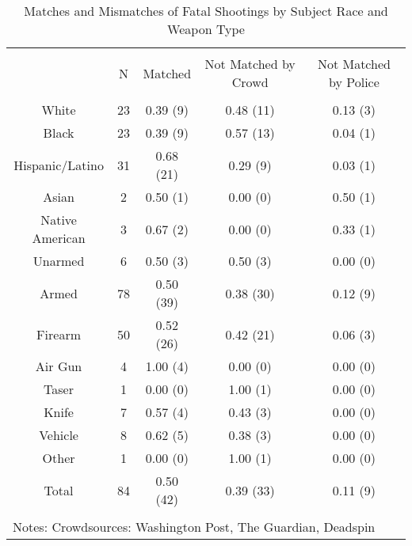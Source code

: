
\begin{table}[!htbp] \centering 
  \caption{Matches and Mismatches of Fatal Shootings by Subject Race and Weapon Type} 
  \label{} 
\footnotesize 
\begin{tabular}{@{\extracolsep{5pt}} ccccc} 
\\[-1.8ex]\hline 
\hline \\[-1.8ex] 
 & N & Matched & Not Matched by Crowd & Not Matched by Police \\ 
\hline \\[-1.8ex] 
White & 23 & 0.39 (9) & 0.48 (11) & 0.13 (3) \\ 
Black & 23 & 0.39 (9) & 0.57 (13) & 0.04 (1) \\ 
Hispanic/Latino & 31 & 0.68 (21) & 0.29 (9) & 0.03 (1) \\ 
Asian & 2 & 0.50 (1) & 0.00 (0) & 0.50 (1) \\ 
Native American & 3 & 0.67 (2) & 0.00 (0) & 0.33 (1) \\ 
Unarmed & 6 & 0.50 (3) & 0.50 (3) & 0.00 (0) \\ 
Armed & 78 & 0.50 (39) & 0.38 (30) & 0.12 (9) \\ 
Firearm & 50 & 0.52 (26) & 0.42 (21) & 0.06 (3) \\ 
Air Gun & 4 & 1.00 (4) & 0.00 (0) & 0.00 (0) \\ 
Taser & 1 & 0.00 (0) & 1.00 (1) & 0.00 (0) \\ 
Knife & 7 & 0.57 (4) & 0.43 (3) & 0.00 (0) \\ 
Vehicle & 8 & 0.62 (5) & 0.38 (3) & 0.00 (0) \\ 
Other & 1 & 0.00 (0) & 1.00 (1) & 0.00 (0) \\ 
Total & 84 & 0.50 (42) & 0.39 (33) & 0.11 (9) \\ 
\hline \\[-1.8ex] 
\multicolumn{5}{l}{Notes: Crowdsources: Washington Post, The Guardian, Deadspin} \\ 
\end{tabular} 
\end{table}  
